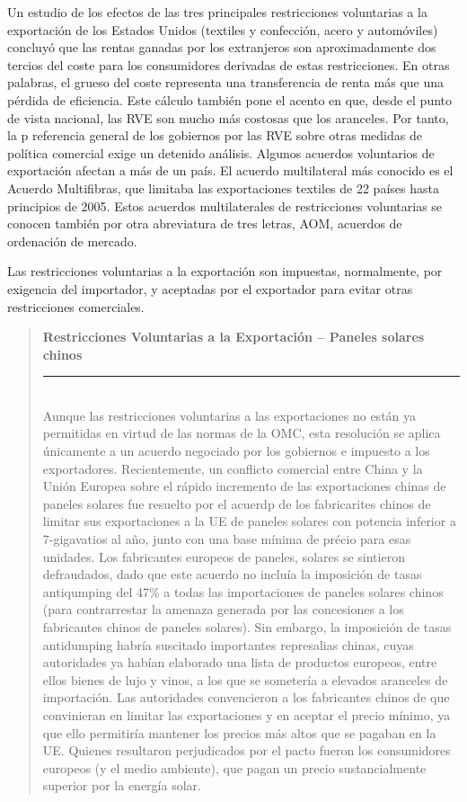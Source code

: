\documentclass[10pt,a4paper]{article}
\newenvironment{specialblock}[1]{%
      \begin{quote} %
      \small %
      \noindent\textbf{#1}\\[-0.3em] %
      \rule{\linewidth}{0.4pt}\\[0.6em]}{
      \end{quote}}
\begin{document}
Un estudio de los efectos de las tres principales restricciones voluntarias a la exportación de los Estados Unidos (textiles y confección, acero y automóviles) concluyó que las rentas ganadas por los extranjeros son aproximadamente dos tercios del coste para los consumidores derivadas de estas restricciones. En otras palabras, el grueso del coste representa una transferencia de renta más que una pérdida de eficiencia. Este cálculo también pone el acento en que, desde el punto de vista nacional, las RVE son mucho más costosas que los aranceles. Por tanto, la p referencia general de los gobiernos por las RVE sobre otras medidas de política comercial exige un detenido análisis. Algunos acuerdos voluntarios de exportación afectan a más de un país. El acuerdo multilateral más conocido es el Acuerdo Multifibras, que limitaba las exportaciones textiles de 22 países hasta principios de 2005. Estos acuerdos multilaterales de restricciones voluntarias se conocen también por otra abreviatura de tres letras, AOM, acuerdos de ordenación de mercado.

Las restricciones voluntarias a la exportación son impuestas, normalmente, por exigencia del importador, y aceptadas por el exportador para evitar otras restricciones comerciales. 

\begin{specialblock}{Restricciones Voluntarias a la Exportación -- Paneles solares chinos}
    Aunque las restricciones voluntarias a las exportaciones no están ya permitidas en virtud de las normas de la OMC, esta resolución se aplica únicamente a un acuerdo negociado por los gobiernos e impuesto a los exportadores. Recientemente, un conflicto comercial entre China y la Unión Europea sobre el rápido incremento de las exportaciones chinas de paneles solares fue resuelto por el acuerdp de los fabricarites chinos de limitar sus exportaciones a la UE de paneles solares con potencia inferior a 7-gigavatios al año, junto con una base mínima de précio para esas unidades. Los fabricantes europeos de paneles, solares se sintieron defraudados, dado que este acuerdo no incluía la imposición de tasas antiqumping del 47\% a todas las importaciones de paneles solares chinos (para contrarrestar la amenaza generada por las concesiones a los fabricantes chinos de paneles solares). Sin embargo, la imposición de tasas antidumping habría suscitado importantes represalias chinas, cuyas autoridades ya habían elaborado una lista de productos europeos, entre ellos bienes de lujo y vinos, a los que se sometería a elevados aranceles de importación. Las autoridades convencieron a los fabricantes chinos de que convinieran en limitar las exportaciones y en aceptar el precio mínimo, ya que ello permitiría mantener los precios más altos que se pagaban en la UE. Quienes resultaron perjudicados por el pacto fueron los consumidores europeos (y el medio ambiente), que pagan un precio sustancialmente superior por la energía solar.
\end{specialblock}
\end{document}
